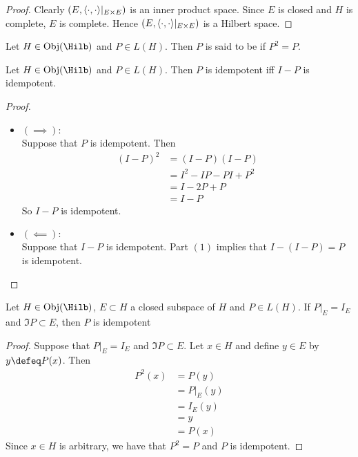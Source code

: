 \documentclass{book}
\begin{document}
\begin{proof}
	Clearly $(E, \langle \cdot, \cdot \rangle|_{E \times E})$ is an inner product space. Since $E$ is closed and $H$ is complete, $E$ is complete. Hence $(E, \langle \cdot, \cdot \rangle|_{E \times E})$ is a Hilbert space.
\end{proof}

\begin{defn}
	Let $H \in \Obj(\Hilb)$ and $P \in L(H)$. Then $P$ is said to be  if $P^2 = P$.
\end{defn}

\begin{ex}
	Let $H \in \Obj(\Hilb)$ and $P \in L(H)$. Then $P$ is idempotent iff $I - P$ is idempotent.
\end{ex}

\begin{proof}\
	\begin{itemize}
		\item $(\implies)$: \\
		Suppose that $P$ is idempotent. Then 
		\begin{align*}
			(I - P)^2
			& = (I - P)(I - P) \\
			& = I^2 - IP - PI + P^2 \\
			& = I -2P + P \\
			& = I - P
		\end{align*}
		So $I -P$ is idempotent.
		\item $(\impliedby):$ \\
		Suppose that $I - P$ is idempotent. Part $(1)$ implies that $I - (I - P) = P$ is idempotent.
	\end{itemize}
\end{proof}

\begin{ex}
	Let $H \in \Obj(\Hilb)$, $E \subset H$ a closed subspace of $H$ and $P \in L(H)$. If $P|_E = I_E$ and $\Im P \subset E$, then $P$ is idempotent
\end{ex}

\begin{proof}
	Suppose that $P|_E = I_E$ and $\Im P \subset E$. Let $x \in H$ and define $y \in E$ by $y \defeq P(x)$. Then 
	\begin{align*}
		P^2(x)
		& = P(y) \\
		& = P|_E(y) \\
		& = I_E(y) \\
		& = y \\
		& = P(x) 
	\end{align*} 
	Since $x \in H$ is arbitrary, we have that $P^2 = P$ and $P$ is idempotent.
\end{proof}
\end{document}
